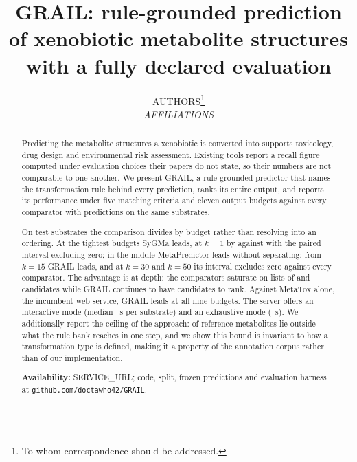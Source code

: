 \documentclass[10pt,twocolumn]{article}
\title{\vspace{-2em}\Large\bfseries GRAIL: rule-grounded prediction of xenobiotic metabolite
structures with a fully declared evaluation}
\author{\normalsize AUTHORS\thanks{To whom correspondence should be addressed.}\\[-0.3em]
\small\itshape AFFILIATIONS}
\date{}
\begin{document}
\maketitle

\begin{abstract}
\noindent
Predicting the metabolite structures a xenobiotic is converted into supports toxicology, drug
design and environmental risk assessment. Existing tools report a recall figure computed under
evaluation choices their papers do not state, so their numbers are not comparable to one another.
We present GRAIL, a rule-grounded predictor that names the transformation rule behind every
prediction, ranks its entire output, and reports its performance under five matching criteria and
eleven output budgets against every comparator with predictions on the same substrates.

On \numPopulationN{} test substrates the comparison divides by budget rather than resolving into
an ordering. At the tightest budgets SyGMa leads, at $k=1$ by \numSweepSygmaOne{} against
\numSweepTrainedOne{} with the paired interval excluding zero; in the middle MetaPredictor leads
without separating; from $k=15$ GRAIL leads, and at $k=30$ and $k=50$ its interval excludes zero
against every comparator. The advantage is at depth: the comparators saturate on lists of
\numOutputMetapredictor{} and \numOutputSygma{} candidates while GRAIL continues to have
candidates to rank. Against MetaTox alone, the incumbent web service, GRAIL leads at all nine
budgets. The server offers an interactive mode (median \numModeInteractiveMedian~s per substrate)
and an exhaustive mode (\numModeExhaustiveMedian~s). We additionally report the ceiling of the
approach: \numCeilingUncovered{} of \numPopulationTestrefs{} reference metabolites lie outside
what the rule bank reaches in one step, and we show this bound is invariant to how a
transformation type is defined, making it a property of the annotation corpus rather than of our
implementation.

\vspace{0.5em}
\noindent\textbf{Availability:} SERVICE\_URL; code, split, frozen predictions and evaluation
harness at \texttt{github.com/doctawho42/GRAIL}.
\end{abstract}





\balance
\end{document}
